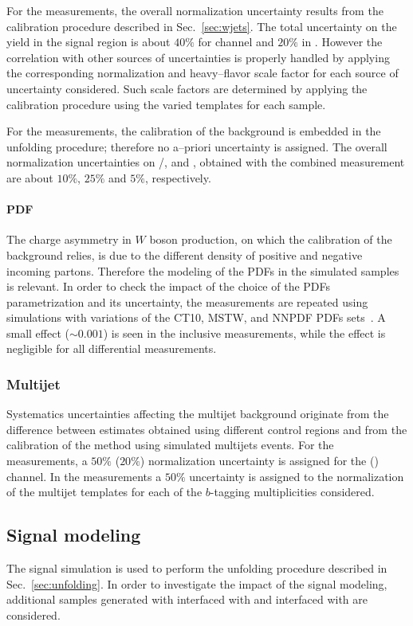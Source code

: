 For the \seventev{} measurements, the overall \wjets{} normalization
uncertainty results from the calibration procedure described in
Sec.~\ref{sec:wjets}. The total uncertainty on the \wjets{} yield in
the signal region is about $40\%$ for \ejets{} channel and $20\%$ in
\mujets{}. However the correlation with other sources of uncertainties
is properly handled by applying the corresponding normalization and
heavy--flavor scale factor for each source of uncertainty considered.
Such scale factors are determined by applying the calibration
procedure using the varied templates for each sample.

For the \eighttev{} measurements, the calibration of the \wjets{}
background is embedded in the unfolding procedure; therefore no
a--priori uncertainty is assigned. The overall normalization
uncertainties on \wbb{}/\wcc{}, \wc{} and \wlight, obtained with the
combined \ljets{} measurement  are about $10\%$, $25\%$ and $5\%$,
respectively.

\paragraph{PDF}
\label{sec:syst_pdf}

The charge asymmetry in $W$ boson production, on which the calibration
of the \wjets{} background relies, is due to the different density of
positive and negative incoming partons. Therefore the modeling of the
PDFs in the simulated \wjets samples is relevant. In order to check
the impact of the choice of the PDFs parametrization and its
uncertainty, the measurements are repeated using \wjets{} simulations
with variations of the CT10, MSTW, and NNPDF PDFs
sets~\cite{pdf4lhc}. A small effect ($\sim0.001$) is seen in the
inclusive \ac{} measurements, while the effect is negligible for all
differential measurements.

\subsubsection{Multijet}
\label{sec:syst_qcd}

Systematics uncertainties affecting the multijet background originate
from the difference between estimates obtained using different control
regions and from the calibration of the method using simulated
multijets events. For the \seventev{} measurements, a $50\%$ ($20\%$)
normalization uncertainty is assigned for the \ejets{} (\mujets{})
channel.
In the \eighttev{} measurements a $50\%$ uncertainty is assigned to the
normalization of the multijet templates for each of the $b$-tagging
multiplicities considered.

\subsection{Signal modeling}

The signal simulation is used to perform the unfolding procedure
described in Sec.~\ref{sec:unfolding}. In order to investigate the
impact of the \ttbar{} signal modeling, additional samples generated
with \mcatnlo{} interfaced with \herwig{} and \powheg{} interfaced
with \herwig{} are considered.